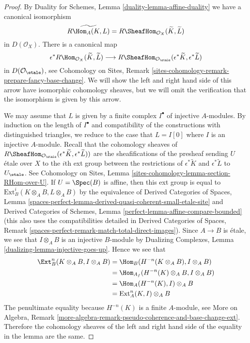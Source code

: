 \begin{proof}
By Duality for Schemes, Lemma \ref{duality-lemma-affine-duality}
we have a canonical isomorphism
$$
\widetilde{R\Hom_A(K, L)} =
R\SheafHom_{\mathcal{O}_X}(\widetilde{K}, \widetilde{L})
$$
in $D(\mathcal{O}_X)$. There is a canonical map
$$
\epsilon^*R\Hom_{\mathcal{O}_X}(\widetilde{K}, \widetilde{L})
\longrightarrow
R\SheafHom_{\mathcal{O}_\etale}(\epsilon^*\widetilde{K},
\epsilon^*\widetilde{L})
$$
in $D(\mathcal{O}_\etale)$, see Cohomology on Sites, Remark
\ref{sites-cohomology-remark-prepare-fancy-base-change}.
We will show the left and right hand side of this arrow
have isomorphic cohomology sheaves, but we will omit the
verification that the isomorphism is given by this arrow.

\medskip\noindent
We may assume that $L$ is given by a finite complex $I^\bullet$
of injective $A$-modules. By induction on the length of $I^\bullet$
and compatibility of the constructions with distinguished triangles,
we reduce to the case that $L = I[0]$ where $I$ is an injective $A$-module.
Recall that the cohomology sheaves of
$R\SheafHom_{\mathcal{O}_\etale}(\epsilon^*\widetilde{K},
\epsilon^*\widetilde{L}))$
are the sheafifications of the presheaf sending $U$ \'etale
over $X$ to the $i$th ext group between the restrictions of
$\epsilon^*\widetilde{K}$ and $\epsilon^*\widetilde{L}$
to $U_\etale$. See
Cohomology on Sites, Lemma
\ref{sites-cohomology-lemma-section-RHom-over-U}.
If $U = \Spec(B)$ is affine, then this ext group
is equal to $\text{Ext}^i_B(K \otimes_A B, L \otimes_A B)$
by the equivalence of
Derived Categories of Spaces, Lemma
\ref{spaces-perfect-lemma-derived-quasi-coherent-small-etale-site} and
Derived Categories of Schemes, Lemma
\ref{perfect-lemma-affine-compare-bounded}
(this also uses the compatibilities detailed in
Derived Categories of Spaces, Remark
\ref{spaces-perfect-remark-match-total-direct-images}).
Since $A \to B$ is \'etale, we see that
$I \otimes_A B$ is an injective $B$-module
by Dualizing Complexes, Lemma \ref{dualizing-lemma-injective-goes-up}.
Hence we see that
\begin{align*}
\Ext^n_B(K \otimes_A B, I \otimes_A B)
& =
\Hom_B(H^{-n}(K \otimes_A B), I \otimes_A B) \\
& =
\Hom_{A_f}(H^{-n}(K) \otimes_A B, I \otimes_A B) \\
& =
\Hom_A(H^{-n}(K), I) \otimes_A B \\
& =
\text{Ext}^n_A(K, I) \otimes_A B
\end{align*}
The penultimate equality because $H^{-n}(K)$ is a finite $A$-module, see
More on Algebra, Remark
\ref{more-algebra-remark-pseudo-coherence-and-base-change-ext}.
Therefore the cohomology sheaves of the left and right hand
side of the equality in the lemma are the same.
\end{proof}

